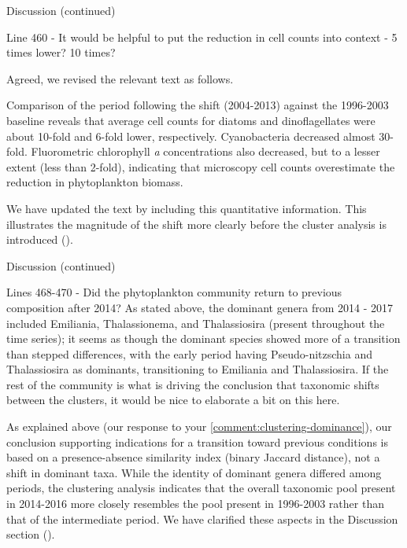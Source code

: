 \documentclass[12pt,english]{reviewresponse}
\begin{document}
\begin{revcomment}
	Discussion (continued)

    Line 460 - It would be helpful to put the reduction in cell counts into context - 5 times lower? 10 times?
\end{revcomment}
\begin{revresponse}
	Agreed, we revised the relevant text as follows.

\begin{changes}
        Comparison of the period following the shift (2004-2013) against the 1996-2003 baseline reveals that average cell counts for diatoms and dinoflagellates were about 10-fold and 6-fold lower, respectively. Cyanobacteria decreased almost 30-fold. Fluorometric chlorophyll \textit{a} concentrations also decreased, but to a lesser extent (less than 2-fold), indicating that microscopy cell counts overestimate the reduction in phytoplankton biomass. 
\end{changes}
    
    We have updated the text by including this quantitative information. This illustrates the magnitude of the shift more clearly before the cluster analysis is introduced ().
\end{revresponse}


\begin{revcomment}
	Discussion (continued)

    Lines 468-470 - Did the phytoplankton community return to previous composition after 2014? As stated above, the dominant genera from 2014 - 2017 included Emiliania, Thalassionema, and Thalassiosira (present throughout the time series); it seems as though the dominant species showed more of a transition than stepped differences, with the early period having Pseudo-nitzschia and Thalassiosira as dominants, transitioning to Emiliania and Thalassiosira. If the rest of the community is what is driving the conclusion that taxonomic shifts between the clusters, it would be nice to elaborate a bit on this here.
\end{revcomment}
\begin{revresponse}
    As explained above (our response to your \autoref{comment:clustering-dominance}), our conclusion supporting indications for a transition toward previous conditions is based on a presence-absence similarity index (binary Jaccard distance), not a shift in dominant taxa. While the identity of dominant genera differed among periods, the clustering analysis indicates that the overall taxonomic pool present in 2014-2016 more closely resembles the pool present in 1996-2003 rather than that of the intermediate period. We have clarified these aspects in the Discussion section ().
\end{revresponse}
\end{document}
